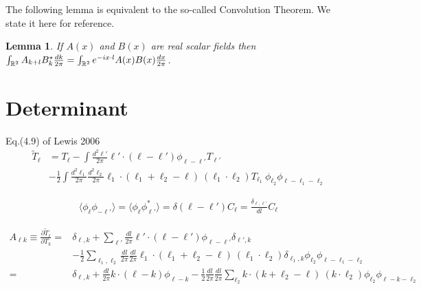 \documentclass[noinfoline]{imsart}
\newtheorem{lemma}{Lemma}
\begin{document}
The following lemma is equivalent to the so-called Convolution Theorem. We state it here for reference.
\begin{lemma}
\label{conv}
If $A(x)$ and $B(x)$ are real scalar fields then  $\int_{\Bbb R^2} A_{k+l}  B^*_k \frac{dk}{2\pi}= \int_{\Bbb R^2} e^{-ix\cdot l} A(x)B(x)\frac{dx}{2\pi}$.
\end{lemma}


\section{Determinant}

Eq.(4.9) of Lewis 2006
\begin{align}
\tilde T_\ell
&= T_\ell -\int \frac{d^2\ell'}{2\pi} \ell'\cdot(\ell-\ell')\phi_{\ell-\ell'} T_{\ell'}\\
& -\frac{1}{2}\int \frac{d^2\ell_1}{2\pi}\frac{d^2\ell_2}{2\pi} \ell_1\cdot(\ell_1+\ell_2-\ell)\ (\ell_1\cdot\ell_2)
T_{\ell_1}\  \phi_{\ell_2}\phi_{\ell-\ell_1-\ell_2} \nonumber
\end{align}

\begin{align}
\langle \phi_\ell \phi_{-\ell'} \rangle=\langle \phi_\ell \phi_{\ell'}^* \rangle = \delta(\ell-\ell') C_\ell
= \frac{\delta_{\ell,\ell'}}{dl} C_\ell
\end{align}

\begin{align}
A_{\ell k}\equiv\frac{\partial \tilde T_\ell}{\partial T_k}
=& \delta_{\ell,k} + \sum_{\ell'}\frac{dl}{2\pi} \ell'\cdot(\ell-\ell')\phi_{\ell-\ell'} \delta_{\ell',k}\\
& -\frac{1}{2}\sum_{\ell_1,\ell_2} \frac{dl}{2\pi}\frac{dl}{2\pi} \ell_1\cdot(\ell_1+\ell_2-\ell)\ (\ell_1\cdot\ell_2)
\delta_{\ell_1,k} \phi_{\ell_2}\phi_{\ell-\ell_1-\ell_2} \nonumber\\
=& \delta_{\ell,k} + \frac{dl}{2\pi} k\cdot(\ell-k) \phi_{\ell-k}
-\frac{1}{2}\frac{dl}{2\pi}\frac{dl}{2\pi} \sum_{\ell_2}  k\cdot(k+\ell_2-\ell)\ (k\cdot\ell_2)
\phi_{\ell_2}\phi_{\ell-k-\ell_2}
\end{align}
\end{document}
